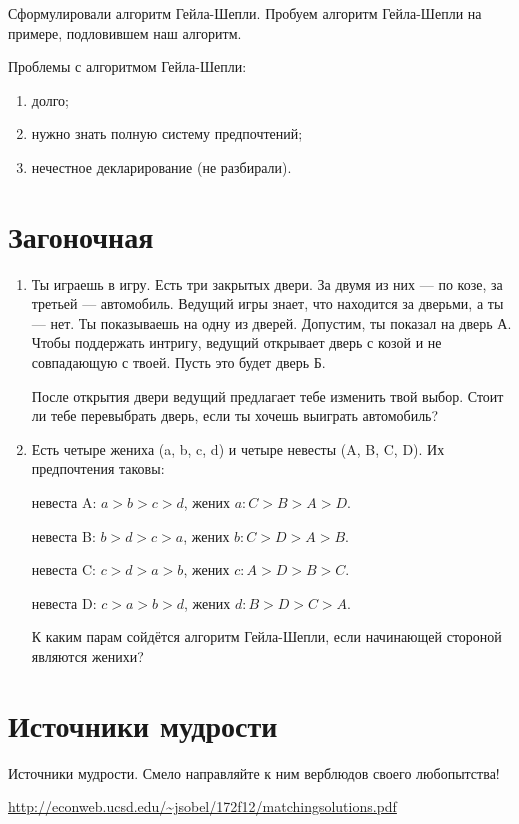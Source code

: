 \documentclass[a4paper, 12pt]{article}
\begin{document}
Сформулировали алгоритм Гейла-Шепли. Пробуем алгоритм Гейла-Шепли на примере, подловившем наш алгоритм.

Проблемы с алгоритмом Гейла-Шепли:

\begin{enumerate}
\item долго;
\item нужно знать полную систему предпочтений;
\item нечестное декларирование (не разбирали).
\end{enumerate}




\section{Загоночная}

\begin{enumerate}
\item Ты играешь в игру. Есть три закрытых двери. За двумя из них — по козе, за третьей — автомобиль. Ведущий игры знает, что находится за дверьми, а  ты — нет. Ты показываешь на одну из дверей. Допустим, ты показал на дверь А. Чтобы поддержать интригу, ведущий открывает дверь с козой и не совпадающую с твоей. Пусть это будет дверь Б.

После открытия двери ведущий предлагает тебе изменить твой выбор. Стоит ли тебе перевыбрать дверь, если ты хочешь выиграть автомобиль?

\item  Есть четыре жениха (a, b, c, d) и четыре невесты (A, B, C, D). Их предпочтения таковы:

невеста A: $a > b > c > d$, жених $a: C>B>A>D$.

невеста B: $b > d > c > a$, жених $b: C>D>A>B$.

невеста C: $c > d > a > b$, жених $c: A>D>B>C$.

невеста D: $c > a > b > d$, жених $d: B>D>C>A$.

К каким парам сойдётся алгоритм Гейла-Шепли, если начинающей стороной являются женихи?


\end{enumerate}


\section{Источники мудрости}

Источники мудрости. Смело направляйте к ним верблюдов своего любопытства!

\nocite{shen2017veroiatnost, shen2007igri, brams2002delim}

\printbibliography

\url{http://econweb.ucsd.edu/~jsobel/172f12/matchingsolutions.pdf}
\end{document}
